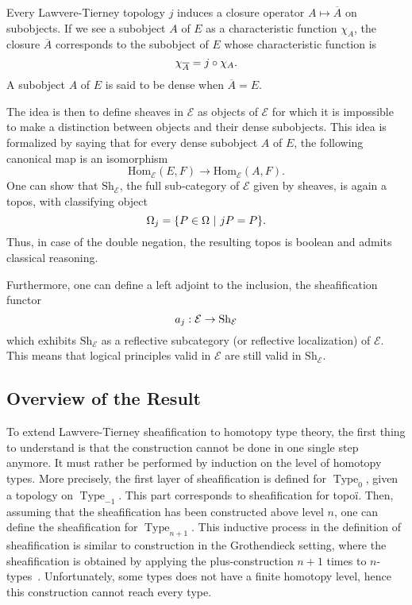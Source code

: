 \documentclass[preprint,9pt,numbers]{sigplanconf}
\DeclareMathOperator{\Type}{Type}
\newcommand \closure[1] {\overline{#1}}
\newcommand \Char[1] {\chi_{#1}}%
\newcommand \E {\mathcal{E}}
\newcommand \Hom[1] {\mathrm{Hom}_{#1}}
\newcommand \Sh[1] {\mathrm{Sh}_{#1}}
\newenvironment{mymath}[1][-0em]{%
  \newcommand\mymathaux{\vspace{#1}}%
  \vspace{#1}%
  \begin{equation*}%
  }{ %
    \mymathaux%
  \end{equation*}}
\begin{document}
Every Lawvere-Tierney topology $j$ induces a closure operator
$A \mapsto \closure{A}$ on subobjects. If we see a subobject $A$ of $E$
as a characteristic function $\Char{A}$, the closure $\closure{A}$
corresponds to the subobject of $E$ whose characteristic function is 
%
\begin{mymath}
\Char{\closure{A}} = j \circ \Char{A}.
\end{mymath}%
%
A subobject $A$ of $E$ is said to
be dense when $\closure{A} = E$.

The idea is then to define sheaves in $\E$ as objects of $\E$ for
which it is impossible to make a distinction between objects and their
dense subobjects. This idea is formalized by saying that for every
dense subobject $A$ of $E$, the following canonical map is an
isomorphism
%
\begin{equation}\label{equ:sheaf_def}
\Hom{\E}(E,F) \rightarrow \Hom{\E}(A,F).
\end{equation}%
%
One can show that $\Sh{\E}$, the full sub-category of $\E$ given by
sheaves, is again a topos, with classifying object
%
\begin{mymath}
\Omega_j = \{ P \in \Omega \ | \ j P  = P \}.
\end{mymath}%
%
Thus, in case of the double negation, the resulting topos is boolean  
and admits classical reasoning.

Furthermore, one can define a left adjoint to the inclusion, the
sheafification functor
%
\begin{mymath}
a_j : \E \rightarrow \Sh{\E}
\end{mymath}%
which exhibits $\Sh{\E}$ as a reflective
subcategory (or reflective localization) of $\E$. This
means that logical principles valid in $\E$ are still valid in
$\Sh{\E}$.


\subsection{Overview of the Result}

To extend Lawvere-Tierney sheafification to homotopy type theory, the
first thing to understand is that the construction cannot be done in one
single step anymore. It must rather be performed by induction on the
level of homotopy types. More precisely, the first layer of
sheafification is defined for $\Type_{0}$, given a topology on
$\Type_{-1}$. This part corresponds to sheafification for topoï. Then,
assuming that the sheafification has been constructed above level $n$,
one can define the sheafification for $\Type_{n+1}$.
%
This inductive process in the definition of sheafification is similar
to construction in the Grothendieck setting, where the
sheafification is obtained by applying the plus-construction $n\!+\!1$
times to
$n$-types~\cite[Chapter~6]{lurie}. Unfortunately, some types does not
have a finite homotopy level, hence this construction cannot reach
every type.
\end{document}
